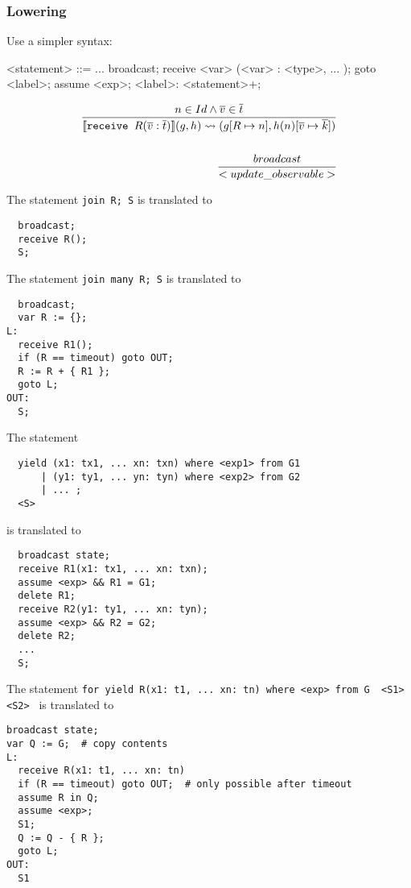 \documentclass[acmsmall,review,anonymous]{acmart}\settopmatter{printfolios=true,printccs=false,printacmref=false}
\begin{document}
\subsubsection{Lowering}
Use a simpler syntax:

\begin{grammar}

  <statement> ::= ...
                  \alt broadcast;
                  \alt receive <var> (<var> : <type>, ... );
                  \alt goto <label>;
                  \alt assume <exp>;
                  \alt <label>: <statement>+;

\end{grammar}

\begin{align*}
  n\in Id \wedge \overline{v} \in \overline{t} \over{
  \llbracket \texttt{receive }R(\overline{v}: \overline{t}) \rrbracket (g, h) \rightsquigarrow (g[R \mapsto n], h(n)[\overline{v} \mapsto \overline{k}]) }\\
  \\
  broadcast \over{
  <update\_observable> } \\
\end{align*}


The statement \texttt{join R; S} is translated to
\begin{lstlisting}
  broadcast;
  receive R();
  S;
\end{lstlisting}

The statement \texttt{join many R; S} is translated to
\begin{lstlisting}
  broadcast;
  var R := {};
L:
  receive R1();
  if (R == timeout) goto OUT;
  R := R + { R1 };
  goto L;
OUT:
  S;
\end{lstlisting}

The statement 
\begin{lstlisting}
  yield (x1: tx1, ... xn: txn) where <exp1> from G1 
      | (y1: ty1, ... yn: tyn) where <exp2> from G2
      | ... ;
  <S>
\end{lstlisting}

is translated to
\begin{lstlisting}
  broadcast state;
  receive R1(x1: tx1, ... xn: txn);
  assume <exp> && R1 = G1;
  delete R1;
  receive R2(y1: ty1, ... xn: tyn);
  assume <exp> && R2 = G2;
  delete R2;
  ...
  S;
\end{lstlisting}

The statement \texttt{for yield R(x1: t1, ... xn: tn) where <exp> from G { <S1> } <S2> } is translated to
\begin{lstlisting}
broadcast state;
var Q := G;  # copy contents
L:
  receive R(x1: t1, ... xn: tn) 
  if (R == timeout) goto OUT;  # only possible after timeout
  assume R in Q;
  assume <exp>;
  S1;
  Q := Q - { R };
  goto L;
OUT:
  S1
\end{lstlisting}
\end{document}
